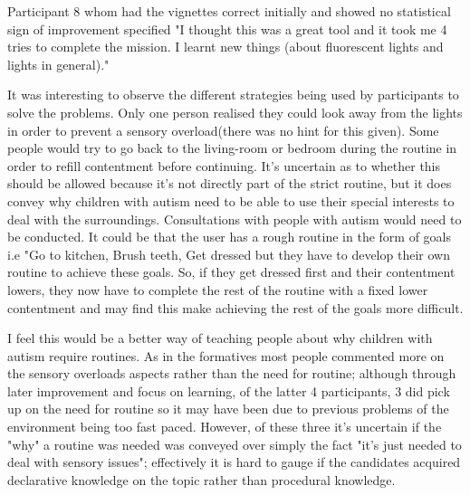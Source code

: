 \documentclass[11pt]{report}
\begin{document}
Participant 8 whom had the vignettes correct initially and showed no statistical sign of improvement specified "I thought this was a great tool and it took me 4 tries to complete the mission. I learnt new things (about fluorescent lights and lights in general)."

It was interesting to observe the different strategies being used by participants to solve the problems. Only one person realised they could look away from the lights in order to prevent a sensory overload(there was no hint for this given). Some people would try to go back to the living-room or bedroom during the routine in order to refill contentment before continuing. It's uncertain as to whether this should be allowed because it's not directly part of the strict routine, but it does convey why children with autism need to be able to use their special interests to deal with the surroundings. Consultations with people with autism would need to be conducted. It could be that the user has a rough routine in the form of goals i.e "Go to kitchen, Brush teeth, Get dressed but they have to develop their own routine to achieve these goals. So, if they get dressed first and their contentment lowers, they now have to complete the rest of the routine with a fixed lower contentment and may find this make achieving the rest of the goals more difficult.

I feel this would be a better way of teaching people about why children with autism require routines. As in the formatives most people commented more on the sensory overloads aspects rather than the need for routine; although through later improvement and focus on learning, of the latter 4 participants, 3 did pick up on the need for routine so it may have been due to previous problems of the environment being too fast paced. However, of these three it's uncertain if the "why" a routine was needed was conveyed over simply the fact "it's just needed to deal with sensory issues"; effectively it is hard to gauge if the candidates acquired declarative knowledge on the topic rather than procedural knowledge.  
\end{document}
